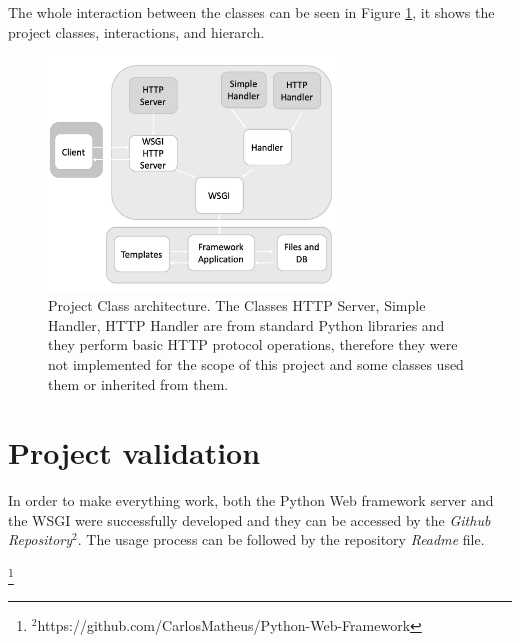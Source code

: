 \documentclass[journal,12pt,onecolumn,draftclsnofoot,]{IEEEtran}
\newcommand\blfootnote[1]{%
  \begingroup
  \renewcommand\thefootnote{}\footnote{#1}%
  \addtocounter{footnote}{-1}%
  \endgroup
}
\let\i\textit
\begin{document}
The whole interaction between the classes can be seen in Figure \ref{fig_project}, it shows the project classes, interactions, and hierarch.

\begin{figure}
  \begin{center}
  \includegraphics[width=3.0in]{./imgs/project.png}
  \caption{Project Class architecture. The Classes HTTP Server, Simple Handler, HTTP Handler are from standard Python libraries and they perform basic HTTP protocol operations, therefore they were not implemented for the scope of this project and some classes used them or inherited from them.}
  \label{fig_project}
  \end{center}
\end{figure}


\section{Project validation}
In order to make everything work, both the Python Web framework server and the WSGI were successfully developed and they can be accessed by the \i{Github Repository}$^2$. The usage process can be followed by the repository \i{Readme} file.

\blfootnote{$^2$https://github.com/CarlosMatheus/Python-Web-Framework}
\end{document}
